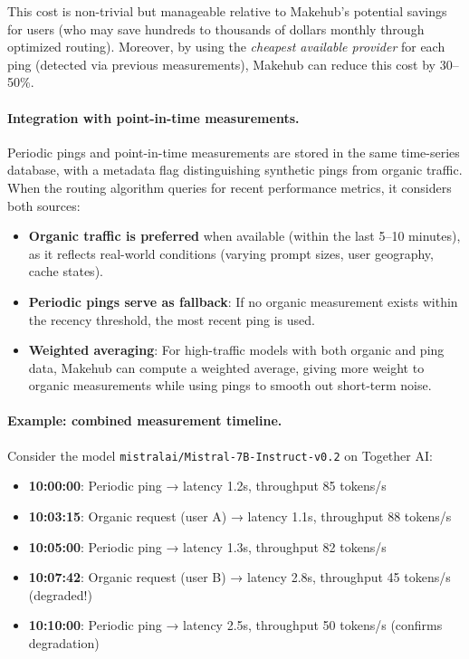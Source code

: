 \documentclass[english]{article}
\begin{document}
This cost is non-trivial but manageable relative to Makehub's potential savings for users (who may save hundreds to thousands of dollars monthly through optimized routing). Moreover, by using the \emph{cheapest available provider} for each ping (detected via previous measurements), Makehub can reduce this cost by 30--50\%.

\paragraph{Integration with point-in-time measurements.}

Periodic pings and point-in-time measurements are stored in the same time-series database, with a metadata flag distinguishing synthetic pings from organic traffic. When the routing algorithm queries for recent performance metrics, it considers both sources:
\begin{itemize}
    \item \textbf{Organic traffic is preferred} when available (within the last 5--10 minutes), as it reflects real-world conditions (varying prompt sizes, user geography, cache states).
    \item \textbf{Periodic pings serve as fallback}: If no organic measurement exists within the recency threshold, the most recent ping is used.
    \item \textbf{Weighted averaging}: For high-traffic models with both organic and ping data, Makehub can compute a weighted average, giving more weight to organic measurements while using pings to smooth out short-term noise.
\end{itemize}

\paragraph{Example: combined measurement timeline.}

Consider the model \texttt{mistralai/Mistral-7B-Instruct-v0.2} on Together AI:
\begin{itemize}
    \item \textbf{10:00:00}: Periodic ping → latency 1.2s, throughput 85 tokens/s
    \item \textbf{10:03:15}: Organic request (user A) → latency 1.1s, throughput 88 tokens/s
    \item \textbf{10:05:00}: Periodic ping → latency 1.3s, throughput 82 tokens/s
    \item \textbf{10:07:42}: Organic request (user B) → latency 2.8s, throughput 45 tokens/s (degraded!)
    \item \textbf{10:10:00}: Periodic ping → latency 2.5s, throughput 50 tokens/s (confirms degradation)
\end{itemize}
\end{document}
